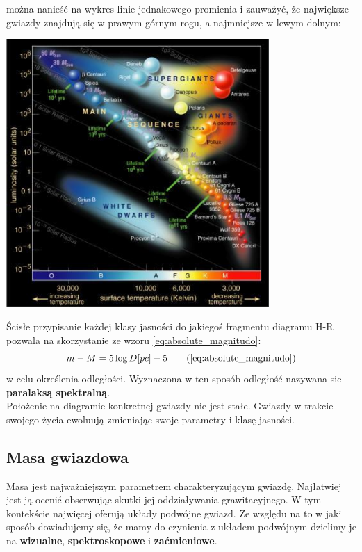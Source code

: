 \documentclass[../index.tex]{subfiles}
\begin{document}
            można nanieść na wykres linie jednakowego promienia i zauważyć, że największe gwiazdy znajdują się w prawym górnym rogu, a najmniejsze w lewym dolnym:
            \begin{center}
                \includegraphics[width=10cm]{images/Hertzsprung-Russell-2.png}
            \end{center}
            Ścisłe przypisanie każdej klasy jasności do jakiegoś fragmentu diagramu H-R pozwala na skorzystanie ze wzoru \ref{eq:absolute_magnitudo}:
            \begin{equation}
                m - M = 5 \log D[pc] - 5 \tag{\ref{eq:absolute_magnitudo}}
            \end{equation}
            w celu określenia odległości. Wyznaczona w ten sposób odległość nazywana sie \textbf{paralaksą spektralną}.\\
            Położenie na diagramie konkretnej gwiazdy nie jest stałe. Gwiazdy w trakcie swojego życia ewoluują zmieniając swoje parametry i klasę jasności.
        \subsection{Masa gwiazdowa}
            Masa jest najważniejszym parametrem charakteryzującym gwiazdę. Najłatwiej jest ją ocenić obserwując skutki jej oddziaływania grawitacyjnego. W tym kontekście najwięcej oferują układy podwójne gwiazd. Ze względu na to w jaki sposób dowiadujemy się, że mamy do czynienia z układem podwójnym dzielimy je na \textbf{wizualne}, \textbf{spektroskopowe} i \textbf{zaćmieniowe}. 
\end{document}
